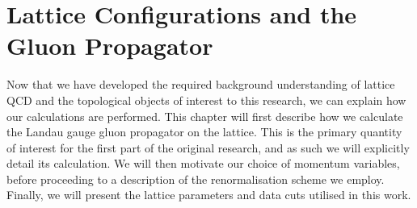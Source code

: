 
\chapter{Lattice Configurations and the Gluon Propagator}\label{chapter:GluonPropagator}
\ifpdf
    \graphicspath{{Chapter4/Figs/Raster/}{Chapter4/Figs/PDF/}{Chapter4/Figs/}}
\else
    \graphicspath{{Chapter4/Figs/Vector/}{Chapter4/Figs/}}
\fi

Now that we have developed the required background understanding of lattice QCD and the topological objects of interest to this research, we can explain how our calculations are performed. This chapter will first describe how we calculate the Landau gauge gluon propagator on the lattice. This is the primary quantity of interest for the first part of the original research, and as such we will explicitly detail its calculation.  We will then motivate our choice of momentum variables, before proceeding to a description of the renormalisation scheme we employ. Finally, we will present the lattice parameters and data cuts utilised in this work.

